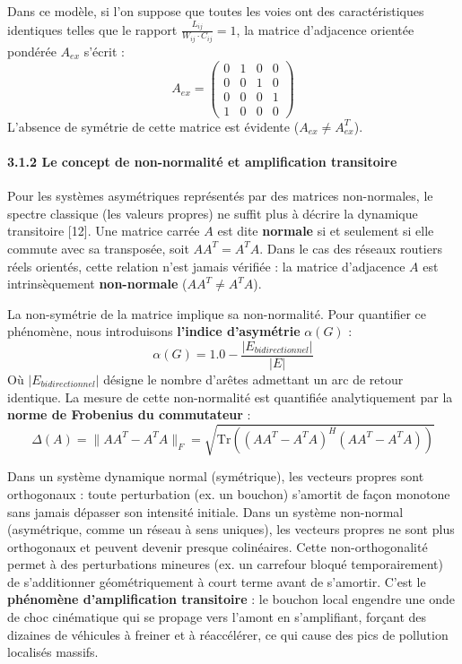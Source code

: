 \documentclass[10pt, a4paper]{article}
\begin{document}
Dans ce modèle, si l'on suppose que toutes les voies ont des
caractéristiques identiques telles que le rapport
\(\frac{L_{ij}}{W_{ij} \cdot C_{ij}} = 1\), la matrice d'adjacence
orientée pondérée \(A_{ex}\) s'écrit : \[A_{ex} = \begin{pmatrix}
0 & 1 & 0 & 0 \\
0 & 0 & 1 & 0 \\
0 & 0 & 0 & 1 \\
1 & 0 & 0 & 0
\end{pmatrix}\] L'absence de symétrie de cette matrice est évidente
(\(A_{ex} \neq A_{ex}^T\)).

\paragraph{3.1.2 Le concept de non-normalité et amplification
transitoire}\label{le-concept-de-non-normalituxe9-et-amplification-transitoire}

Pour les systèmes asymétriques représentés par des matrices
non-normales, le spectre classique (les valeurs propres) ne suffit plus
à décrire la dynamique transitoire {[}12{]}. Une matrice carrée \(A\)
est dite \textbf{normale} si et seulement si elle commute avec sa
transposée, soit \(A A^T = A^T A\). Dans le cas des réseaux routiers
réels orientés, cette relation n'est jamais vérifiée : la matrice
d'adjacence \(A\) est intrinsèquement \textbf{non-normale}
(\(A A^T \neq A^T A\)).

La non-symétrie de la matrice implique sa non-normalité. Pour quantifier
ce phénomène, nous introduisons \textbf{l'indice d'asymétrie}
\(\alpha(G)\) : \[\alpha(G) = 1.0 - \frac{|E_{bidirectionnel}|}{|E|}\]
Où \(|E_{bidirectionnel}|\) désigne le nombre d'arêtes admettant un arc
de retour identique. La mesure de cette non-normalité est quantifiée
analytiquement par la \textbf{norme de Frobenius du commutateur} :
\[\Delta(A) = \| A A^T - A^T A \|_F = \sqrt{\text{Tr}\left( (A A^T - A^T A)^H (A A^T - A^T A) \right)}\]

Dans un système dynamique normal (symétrique), les vecteurs propres sont
orthogonaux : toute perturbation (ex. un bouchon) s'amortit de façon
monotone sans jamais dépasser son intensité initiale. Dans un système
non-normal (asymétrique, comme un réseau à sens uniques), les vecteurs
propres ne sont plus orthogonaux et peuvent devenir presque colinéaires.
Cette non-orthogonalité permet à des perturbations mineures (ex. un
carrefour bloqué temporairement) de s'additionner géométriquement à
court terme avant de s'amortir. C'est le \textbf{phénomène
d'amplification transitoire} : le bouchon local engendre une onde de
choc cinématique qui se propage vers l'amont en s'amplifiant, forçant
des dizaines de véhicules à freiner et à réaccélérer, ce qui cause des
pics de pollution localisés massifs.
\end{document}
